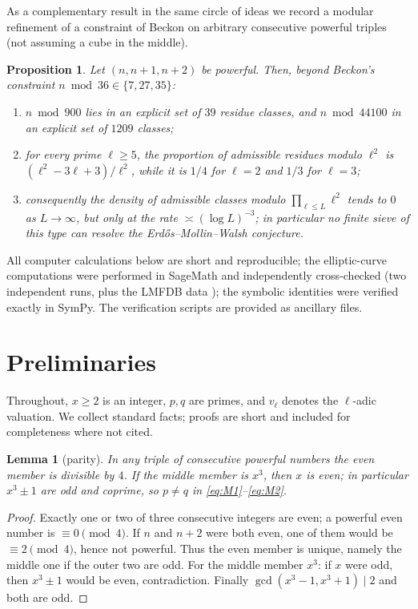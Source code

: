 \documentclass[11pt]{article}
\newtheorem{lemma}[theorem]{Lemma}
\newtheorem{proposition}[theorem]{Proposition}
\theoremstyle{remark}
\newcommand{\vp}{v}
\begin{document}
As a complementary result in the same circle of ideas we record a modular refinement of a constraint of Beckon \cite{Beckon} on arbitrary consecutive powerful triples (not assuming a cube in the middle).

\begin{proposition}\label{prop:beckon}
Let $(n,n+1,n+2)$ be powerful. Then, beyond Beckon's constraint $n \bmod 36\in\{7,27,35\}$:
\begin{enumerate}
\item[(i)] $n \bmod 900$ lies in an explicit set of $39$ residue classes, and $n \bmod 44100$ in an explicit set of $1209$ classes;
\item[(ii)] for every prime $\ell \ge 5$, the proportion of admissible residues modulo $\ell^2$ is $(\ell^2-3\ell+3)/\ell^2$, while it is $1/4$ for $\ell=2$ and $1/3$ for $\ell=3$;
\item[(iii)] consequently the density of admissible classes modulo $\prod_{\ell\le L}\ell^2$ tends to $0$ as $L\to\infty$, but only at the rate $\asymp (\log L)^{-3}$; in particular no finite sieve of this type can resolve the Erd\H{o}s--Mollin--Walsh conjecture.
\end{enumerate}
\end{proposition}

All computer calculations below are short and reproducible; the elliptic-curve computations were performed in SageMath and independently cross-checked (two independent runs, plus the LMFDB data \cite{LMFDB}); the symbolic identities were verified exactly in SymPy. The verification scripts are provided as ancillary files.

\section{Preliminaries}\label{sec:prelim}

Throughout, $x\ge 2$ is an integer, $p,q$ are primes, and $\vp_\ell$ denotes the $\ell$-adic valuation. We collect standard facts; proofs are short and included for completeness where not cited.

\begin{lemma}[parity]\label{lem:parity}
In any triple of consecutive powerful numbers the even member is divisible by $4$. If the middle member is $x^3$, then $x$ is even; in particular $x^3\pm1$ are odd and coprime, so $p\neq q$ in \eqref{eq:M1}--\eqref{eq:M2}.
\end{lemma}
\begin{proof}
Exactly one or two of three consecutive integers are even; a powerful even number is $\equiv 0 \pmod 4$. If $n$ and $n+2$ were both even, one of them would be $\equiv 2\pmod 4$, hence not powerful. Thus the even member is unique, namely the middle one if the outer two are odd. For the middle member $x^3$: if $x$ were odd, then $x^3\pm1$ would be even, contradiction. Finally $\gcd(x^3-1,x^3+1)\mid 2$ and both are odd.
\end{proof}
\end{document}
